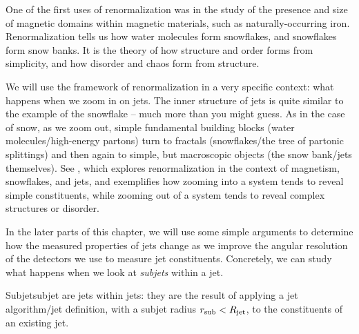 

One of the first uses of renormalization was in the study of the presence and size of magnetic domains within magnetic materials, such as naturally-occurring iron.
%
Renormalization tells us how water molecules form snowflakes, and snowflakes form snow banks.
%
It is the theory of how structure and order forms from simplicity, and how disorder and chaos form from structure.


We will use the framework of renormalization in a very specific context:
%
what happens when we zoom in on jets.
%
The inner structure of jets is quite similar to the example of the snowflake -- much more than you might guess.
%
As in the case of snow, as we zoom out, simple fundamental building blocks (water molecules/high-energy partons) turn to fractals (snowflakes/the tree of partonic splittings) and then again to simple, but macroscopic objects (the snow bank/jets themselves).
%
See , which explores renormalization in the context of magnetism, snowflakes, and jets, and exemplifies how zooming into a system tends to reveal simple constituents, while zooming out of a system tends to reveal complex structures or disorder.


In the later parts of this chapter, we will use some simple arguments to determine how the measured properties of jets change as we improve the angular resolution of the detectors we use to measure jet constituents.
%
Concretely, we can study what happens when we look at \textit{subjets} within a jet.
%
\begin{definitionbox}{Subjet}{subjet}
     are jets within jets:
    they are the result of applying a jet algorithm/jet definition, with a subjet radius \(r_\text{sub} < R_\text{jet}\), to the constituents of an existing jet.
\end{definitionbox}


